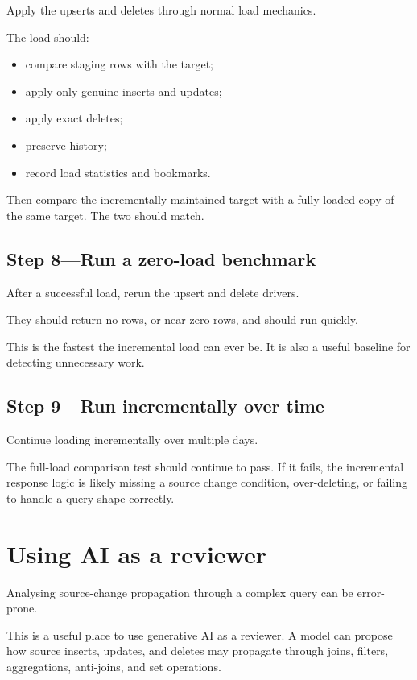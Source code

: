 \documentclass[10pt,openany,10pt]{book}
\providecommand{\tightlist}{%
  \setlength{\itemsep}{0pt}\setlength{\parskip}{0pt}}
\begin{document}
Apply the upserts and deletes through normal load mechanics.

The load should:

\begin{itemize}
\tightlist
\item
  compare staging rows with the target;
\item
  apply only genuine inserts and updates;
\item
  apply exact deletes;
\item
  preserve history;
\item
  record load statistics and bookmarks.
\end{itemize}

Then compare the incrementally maintained target with a fully loaded
copy of the same target. The two should match.

\subsection{Step 8---Run a zero-load
benchmark}\label{step-8run-a-zero-load-benchmark}

After a successful load, rerun the upsert and delete drivers.

They should return no rows, or near zero rows, and should run quickly.

This is the fastest the incremental load can ever be. It is also a
useful baseline for detecting unnecessary work.

\subsection{Step 9---Run incrementally over
time}\label{step-9run-incrementally-over-time}

Continue loading incrementally over multiple days.

The full-load comparison test should continue to pass. If it fails, the
incremental response logic is likely missing a source change condition,
over-deleting, or failing to handle a query shape correctly.

\section{Using AI as a reviewer}\label{using-ai-as-a-reviewer}

Analysing source-change propagation through a complex query can be
error-prone.

This is a useful place to use generative AI as a reviewer. A model can
propose how source inserts, updates, and deletes may propagate through
joins, filters, aggregations, anti-joins, and set operations.
\end{document}
